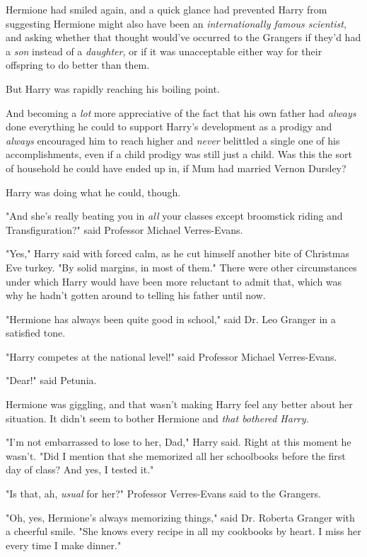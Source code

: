 Hermione had smiled again, and a quick glance had prevented Harry from 
suggesting Hermione might also have been an \emph{internationally famous 
scientist}, and asking whether that thought would've occurred to the Grangers 
if they'd had a \emph{son} instead of a \emph{daughter}, or if it was 
unacceptable either way for their offspring to do better than them.

But Harry was rapidly reaching his boiling point.

And becoming a \emph{lot} more appreciative of the fact that his own father had 
\emph{always} done everything he could to support Harry's development as a 
prodigy and \emph{always} encouraged him to reach higher and \emph{never} 
belittled a single one of his accomplishments, even if a child prodigy was 
still just a child. Was this the sort of household he could have ended up in, 
if Mum had married Vernon Dursley?

Harry was doing what he could, though.

"And she's really beating you in \emph{all} your classes except broomstick 
riding and Transfiguration?" said Professor Michael Verres-Evans.

"Yes," Harry said with forced calm, as he cut himself another bite of Christmas 
Eve turkey. "By solid margins, in most of them." There were other circumstances 
under which Harry would have been more reluctant to admit that, which was why 
he hadn't gotten around to telling his father until now.

"Hermione has always been quite good in school," said Dr. Leo Granger in a 
satisfied tone.

"Harry competes at the national level!" said Professor Michael Verres-Evans.

"Dear!" said Petunia.

Hermione was giggling, and that wasn't making Harry feel any better about her 
situation. It didn't seem to bother Hermione and \emph{that bothered Harry.}

"I'm not embarrassed to lose to her, Dad," Harry said. Right at this moment he 
wasn't. "Did I mention that she memorized all her schoolbooks before the first 
day of class? And yes, I tested it."

"Is that, ah, \emph{usual} for her?" Professor Verres-Evans said to the 
Grangers.

"Oh, yes, Hermione's always memorizing things," said Dr. Roberta Granger with a 
cheerful smile. "She knows every recipe in all my cookbooks by heart. I miss 
her every time I make dinner."

